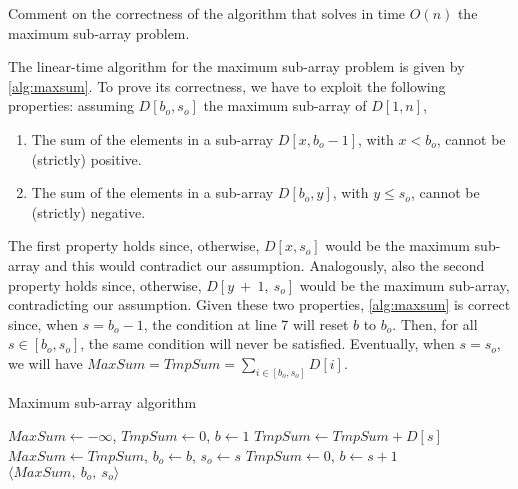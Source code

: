 \exercise

Comment on the correctness of the algorithm that solves in time $O(n)$ the
maximum sub-array problem.

\solution

The linear-time algorithm for the maximum sub-array problem is given by
\autoref{alg:maxsum}. To prove its correctness, we have to exploit the
following properties: assuming $D[b_o, s_o]$ the maximum sub-array of $D[1, n]$,
%
\begin{enumerate}
  \item The sum of the elements in a sub-array $D[x, b_o - 1]$, with $x < b_o$,
  cannot be (strictly) positive.
  \item The sum of the elements in a sub-array $D[b_o, y]$, with $y \le s_o$,
  cannot be (strictly) negative.
\end{enumerate}
%
The first property holds since, otherwise, $D[x, s_o]$ would be the maximum
sub-array and this would contradict our assumption. Analogously, also the second
property holds since, otherwise, $D[y~+~1,~s_o]$ would be the maximum sub-array,
contradicting our assumption. Given these two properties,
\autoref{alg:maxsum} is correct since, when $s = b_o - 1$, the condition
at line 7 will reset $b$ to $b_o$. Then, for all $s \in [b_o, s_o]$, the same
condition will never be satisfied. Eventually, when $s = s_o$, we will have
$MaxSum = TmpSum = \sum_{i \in [b_o, s_o]} D[i]$.
%
\begin{algorithm}[h]
\caption{Maximum sub-array algorithm}\label{alg:maxsum}
\begin{algorithmic}[1]
\State $MaxSum \gets -\infty$, $TmpSum \gets 0$, $b \gets 1$
\State $TmpSum \gets TmpSum + D[s]$
\State $MaxSum \gets TmpSum$, $b_o \gets b$, $s_o \gets s$
\EndIf
{}
\State $TmpSum \gets 0$, $b \gets s + 1$
\EndIf
\EndFor
\State \Return $\langle MaxSum,\ b_o,\ s_o \rangle$
\end{algorithmic}
\end{algorithm}
